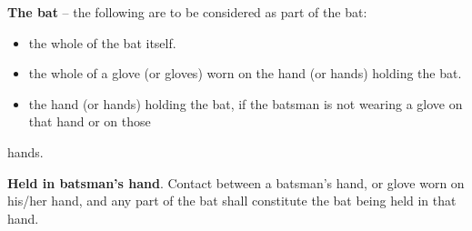\documentclass[12pt]{article}
\begin{document}
\vspace{\baselineskip}

\vspace{\baselineskip}
\begin{Center}
{\fontsize{8pt}{9.6pt}\par}
\end{Center}\par


\vspace{\baselineskip}
{\fontsize{9pt}{10.8pt} \tabto{0.39in} {\fontsize{8pt}{9.6pt}\selectfont \textbf{The bat }–\textbf{ }the following are to be considered as part of the bat:\par}\par}\par


\vspace{\baselineskip}
\begin{itemize}
	\item {\fontsize{9pt}{10.8pt}\selectfont the whole of the bat itself.\par}\par


\vspace{\baselineskip}
	\item {\fontsize{9pt}{10.8pt}\selectfont the whole of a glove (or gloves) worn on the hand (or hands) holding the bat.\par}\par


\vspace{\baselineskip}
	\item {\fontsize{9pt}{10.8pt}\selectfont the hand (or hands) holding the bat, if the batsman is not wearing a glove on that hand or on those\par}
\end{itemize}\par


\vspace{\baselineskip}
\begin{adjustwidth}{0.49in}{0.0in}
{\fontsize{9pt}{10.8pt}\selectfont hands.\par}\par

\end{adjustwidth}


\vspace{\baselineskip}
\begin{adjustwidth}{0.4in}{0.01in}
{\fontsize{9pt}{10.8pt} \tabto{0.39in} \textbf{Held in batsman’s hand}. Contact between a batsman’s hand, or glove worn on his/her hand, and any part of\textbf{ }the bat shall constitute the bat being held in that hand.\par}\par

\end{adjustwidth}
\end{document}
